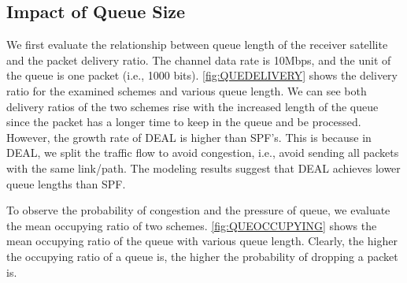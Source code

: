 \subsection{Impact of Queue Size}
We first evaluate the relationship between queue length of the receiver satellite and the packet delivery ratio. The channel data rate is 10Mbps, and the unit of the queue is one packet (i.e., 1000 bits). \ref{fig:QUEDELIVERY} shows the delivery ratio for the examined schemes and various queue length. We can see both delivery ratios of the two schemes rise with the increased length of the queue since the packet has a longer time to keep in the queue and be processed. However, the growth rate of DEAL is higher than SPF's. This is because in DEAL, we split the traffic flow to avoid congestion, i.e., avoid sending all packets with the same link/path.  The modeling results suggest that DEAL achieves lower queue lengths than SPF.

To observe the probability of congestion and the pressure of queue, we evaluate the mean occupying ratio of two schemes. \ref{fig:QUEOCCUPYING} shows the mean occupying ratio of the queue with various queue length. Clearly, the higher the occupying ratio of a queue is, the higher the probability of dropping a packet is. 

